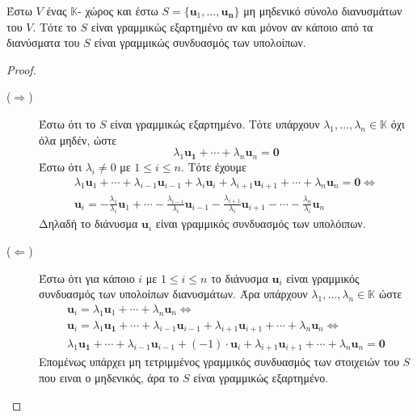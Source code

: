 \begin{thm}\label{thm:s1s2depend}
  Έστω $V$ ένας $ \mathbb{K} $- χώρος και έστω 
  $ S = \{ \mathbf{u}_{1}, \ldots, \mathbf{u_{n}} \} $ μη μηδενικό σύνολο 
  διανυσμάτων του $V$. Τότε το $S$ είναι γραμμικώς εξαρτημένο αν και μόνον αν 
  κάποιο από τα διανύσματα του $S$ είναι γραμμικώς συνδυασμός των υπολοίπων. 
\end{thm}
\begin{proof}
\item {}
  \begin{description}
    \item [($ \Rightarrow $)] Έστω ότι το $S$ είναι γραμμικώς εξαρτημένο. Τότε 
      υπάρχουν $ \lambda _{1}, \ldots, \lambda_{n} \in \mathbb{K} $ όχι 
      όλα μηδέν, ώστε 
      \[
        \lambda _{1} \mathbf{u_{1}} + \cdots + \lambda _{n} \mathbf{u}_{n} = 
        \mathbf{0}  
      \] 
      Έστω ότι $ \lambda _{i} \neq 0 $ με $ 1 \leq i \leq n $. Τότε έχουμε
      \begin{align*}
        \lambda _{1} \mathbf{u}_{1} + \cdots + \lambda _{i-1} 
        \mathbf{u}_{i-1} + \lambda _{i} \mathbf{u}_{i} + \lambda _{i+1} 
        \mathbf{u}_{i+1} + \cdots + \lambda _{n}
        \mathbf{u}_{n} = \mathbf{0} \Leftrightarrow  \\
        \mathbf{u}_{i} = - \frac{\lambda _{1}}{\lambda _{i}} \mathbf{u}_{1} +
        \cdots - \frac{\lambda _{i-1}}{\lambda _{i}} \mathbf{u}_{i-1} - 
        \frac{\lambda _{i+1}}{\lambda _{i}} \mathbf{u}_{i+1} - 
        \cdots - \frac{\lambda _{n}}{\lambda _{i}} \mathbf{u}_{n} 
      \end{align*} 
      Δηλαδή το διάνυσμα $ \mathbf{u}_{i} $ είναι γραμμικός συνδυασμός των 
      υπολόιπων.
    \item [($\Leftarrow$)] 
      Έστω ότι για κάποιο $ i $ με $ 1 \leq i \leq n $ το διάνυσμα 
      $ \mathbf{u}_{i} $ είναι γραμμικός συνδυασμός των υπολοίπων διανυσμάτων.
      Άρα υπάρχουν $ \lambda _{1}, \ldots, \lambda _{n} \in \mathbb{K} $ 
      ώστε 
      \begin{gather*}
        \mathbf{u}_{i} = \lambda _{1} \mathbf{u}_{1} + \cdots + 
        \lambda _{n} \mathbf{u}_{n} \Leftrightarrow \\
        \mathbf{u}_{i} = \lambda _{1} \mathbf{u_{1}} + \cdots + 
        \lambda _{i-1}
        \mathbf{u}_{i-1} + \lambda _{i+1} \mathbf{u}_{i+1} + \cdots + 
        \lambda _{n} \mathbf{u}_{n} \Leftrightarrow \\
        \lambda _{1} \mathbf{u_{1}} + \cdots + \lambda _{i-1}
        \mathbf{u}_{i-1} + (-1) \cdot \mathbf{u}_{i} + \lambda _{i+1} 
        \mathbf{u}_{i+1} + \cdots + \lambda _{n} \mathbf{u}_{n} = \mathbf{0}
      \end{gather*}
      Επομένως υπάρχει μη τετριμμένος γραμμικός συνδυασμός των στοιχειών του 
      $S$ που ειναι ο μηδενικός, άρα το $S$ είναι γραμμικώς εξαρτημένο.
  \end{description}
\end{proof}


